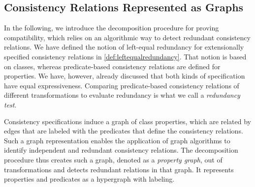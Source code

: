 \subsection{Consistency Relations Represented as Graphs}

In the following, we introduce the decomposition procedure for proving compatibility, which relies on an algorithmic way to detect redundant consistency relations. 
We have defined the notion of left-equal redundancy for extensionally specified consistency relations in \autoref{def:leftequalredundancy}.
That notion is based on classes, whereas predicate-based consistency relations are defined for properties.
We have, however, already discussed that both kinds of specification have equal expressiveness.
Comparing predicate-based consistency relations of different transformations to evaluate redundancy is what we call a \emph{redundancy test}.

Consistency specifications induce a graph of class properties, which are related by edges that are labeled with the predicates that define the consistency relations.
Such a graph representation enables the application of graph algorithms to identify independent and redundant consistency relations.
The decomposition procedure thus creates such a graph, denoted as a \emph{property graph}, out of \qvtr transformations and detects redundant relations in that graph.
It represents properties and predicates as a hypergraph with labeling.

